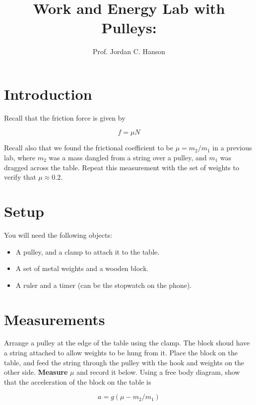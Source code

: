 \documentclass{article}
\begin{document}
\title{Work and Energy Lab with Pulleys: }
\author{Prof. Jordan C. Hanson}

\maketitle

\section{Introduction}

Recall that the friction force is given by

\begin{equation}
f = \mu N
\end{equation}

Recall also that we found the frictional coefficient to be $\mu = m_2/m_1$ in a previous lab, where $m_2$ was a mass dangled from a string over a pulley, and $m_1$ was dragged across the table.  Repeat this measurement with the set of weights to verify that $\mu \approx 0.2$.

\section{Setup}

You will need the following objects:

\begin{itemize}
\item A pulley, and a clamp to attach it to the table.
\item A set of metal weights and a wooden block.
\item A ruler and a timer (can be the stopwatch on the phone).
\end{itemize}

\section{Measurements}

Arrange a pulley at the edge of the table using the clamp.  The block shoud have a string attached to allow weights to be hung from it.  Place the block on the table, and feed the string through the pulley with the hook and weights on the other side.  \textbf{Measure} $\mu$ and record it below.  Using a free body diagram, show that the acceleration of the block on the table is

\begin{equation}
a = g(\mu - m_2 / m_1)
\end{equation}
\end{document}
